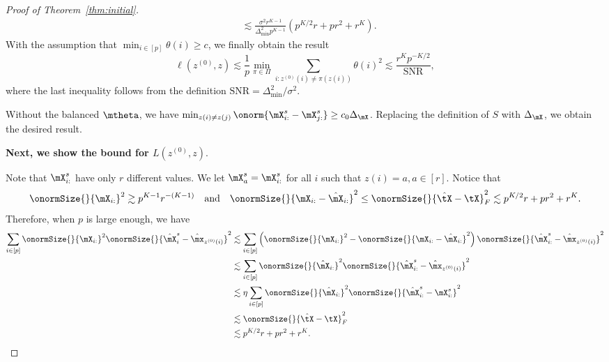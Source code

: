 \documentclass[lettersize,onecolumn,journal]{IEEEtran}
\theoremstyle{definition}
\theoremstyle{definition}
\newcommand{\of}[1]{\left(#1\right)}
\begin{document}
\begin{proof}[Proof of Theorem~\ref{thm:initial}]
\begin{align}
        & \lesssim \frac{\sigma^2 r^{K-1}}{ \Delta_{\min}^2  p^{K-1} } \of{ p^{K/2}r + pr^2 + r^K }.
    \end{align}
    With the assumption that $\min_{i \in [p]} \theta(i) \geq c$, we finally obtain the result
    \begin{equation}
        \ell(z^{(0)}, z) \lesssim \frac{1}{p}\min_{\pi \in \Pi} \sum_{i : z^{(0)}(i) \neq \pi(z(i))} \theta(i)^2 \lesssim \frac{r^K p^{-K/2} }{ \text{SNR} },
    \end{equation}
    where the last inequality follows from the definition $\text{SNR} = \Delta_{\min}^2/\sigma^2$.
    
      {Without the balanced $\mtheta$, we have $\min_{z(i) \neq z(j)} \onorm{ \mX^s_{i:} - \mX^s_{j:} } \geq c_0  \Delta_{\mX}$. Replacing the definition of $S$ with $\Delta_{\mX}$, we obtain the desired result.}
    
    \textbf{Next, we show the bound for $L(z^{(0)}, z).$}
    
    Note that $\mX_{i:}^s$ have only $r$ different values. We let $\mX_a^s = \mX_{i:}^s$ for all $i$ such that $z(i) = a, a \in [r]$. 
    Notice that 
\begin{equation}
    \onormSize{}{\mX_{i:}}^2 \gtrsim p^{K-1} r^{-(K-1)} \quad \text{and} \quad \onormSize{}{\mX_{i:} - \hat \mX_{i:}}^2 \leq \onormSize{}{\hat \tX - \tX}_F^2 \lesssim  p^{K/2}r + pr^2 + r^K .
\end{equation}
Therefore, when $p$ is large enough, we have 
\begin{align}
    \sum_{i \in [p]} \onormSize{}{\mX_{i:}}^2 \onormSize{}{\hat \mX_i^s - \hat \mx_{z^{(0)}(i)}}^2 &\lesssim \sum_{i \in [p]} \of{\onormSize{}{\mX_{i:}}^2 - \onormSize{}{\mX_{i:} - \hat \mX_{i:}}^2} \onormSize{}{\hat \mX_{i:}^s - \hat \mx_{z^{(0)}(i)}}^2\\
   & \lesssim \sum_{i \in [p]} \onormSize{}{\hat \mX_{i:}}^2 \onormSize{}{\hat \mX_{i:}^s - \hat \mx_{z^{(0)}(i)}}^2 \\
   & \lesssim \eta  \sum_{i \in [p]} \onormSize{}{\hat \mX_{i:}}^2 \onormSize{}{\hat \mX_{i:}^s - \mX_{i:}^s}^2 \\
   & \lesssim \onormSize{}{\hat \tX - \tX}_F^2 \\
   & \lesssim p^{K/2}r + pr^2 + r^K .\label{eq:cor_1}
\end{align}


\end{proof}
\end{document}
